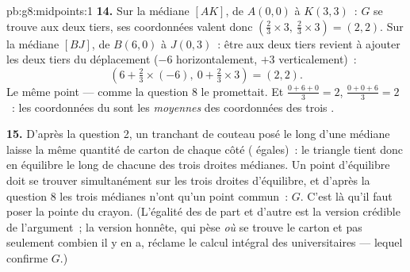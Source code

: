 \begin{solution}{pb:g8:midpoints:1}
\textbf{14.} Sur la médiane $[AK]$, de $A(0,0)$ à $K(3,3)$~: $G$ se
trouve aux deux tiers, ses coordonnées valent donc
$\left(\frac23 \times 3,\ \frac23 \times 3\right) = (2, 2)$. Sur la
médiane $[BJ]$, de $B(6, 0)$ à $J(0, 3)$~: être aux deux tiers
revient à ajouter les deux tiers du déplacement ($-6$
horizontalement, $+3$ verticalement)~:
\[
\left(6 + \tfrac23 \times (-6),\ 0 + \tfrac23 \times 3\right)
= (2, 2) .
\]
Le même point --- comme la question 8 le promettait. Et
$\frac{0 + 6 + 0}{3} = 2$, $\frac{0 + 0 + 6}{3} = 2$~: les
coordonnées du  sont les \emph{moyennes} des
coordonnées des trois .

\textbf{15.} D'après la question 2, un tranchant de couteau posé le
long d'une médiane laisse la même quantité de carton de chaque côté
( égales)~: le triangle tient donc en équilibre le long de
chacune des trois droites médianes. Un point d'équilibre doit se
trouver simultanément sur les trois droites d'équilibre, et d'après
la question 8 les trois médianes n'ont qu'un point commun~: $G$.
C'est là qu'il faut poser la pointe du crayon. (L'égalité des 
de part et d'autre est la version crédible de l'argument~; la
version honnête, qui pèse \emph{où} se trouve le carton et pas
seulement combien il y en a, réclame le calcul intégral des 
universitaires --- lequel confirme $G$.)
\end{solution}
